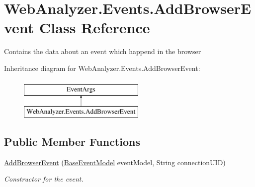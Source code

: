 \hypertarget{class_web_analyzer_1_1_events_1_1_add_browser_event}{}\section{Web\+Analyzer.\+Events.\+Add\+Browser\+Event Class Reference}
\label{class_web_analyzer_1_1_events_1_1_add_browser_event}


Contains the data about an event which happend in the browser  


Inheritance diagram for Web\+Analyzer.\+Events.\+Add\+Browser\+Event\+:\begin{figure}[H]
\begin{center}
\leavevmode
\includegraphics[height=2.000000cm]{class_web_analyzer_1_1_events_1_1_add_browser_event}
\end{center}
\end{figure}
\subsection*{Public Member Functions}
\begin{DoxyCompactItemize}
\item 
\hyperlink{class_web_analyzer_1_1_events_1_1_add_browser_event_a910bd810ed4407cd55d46a16bd302bbc}{Add\+Browser\+Event} (\hyperlink{class_web_analyzer_1_1_models_1_1_event_model_1_1_base_event_model}{Base\+Event\+Model} event\+Model, String connection\+U\+I\+D)
\begin{DoxyCompactList}\small\item\em Constructor for the event. \end{DoxyCompactList}\end{DoxyCompactItemize}
